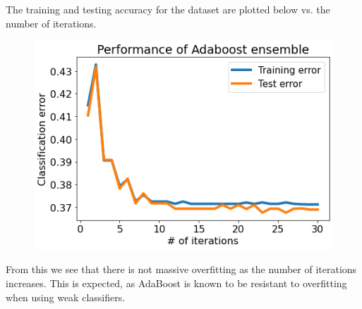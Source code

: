 \documentclass{article}
\begin{document}
\begin{enumerate}
			The training and testing accuracy for the dataset are plotted below vs. the number of iterations.

			\begin{figure}[H]
                                \centering
                                \includegraphics[scale=0.5]{img/boost-acc.png}
                        \end{figure}
			From this we see that there is not massive overfitting as the number of iterations increases. This is expected, as AdaBoost is known to be resistant to overfitting when using weak classifiers.

	\end{enumerate}
\end{document}
